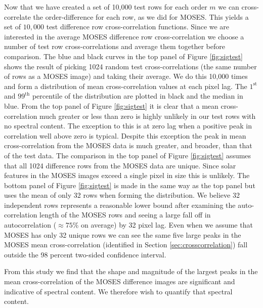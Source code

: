		Now that we have created a set of 10,000 test rows for each order $m$ we can cross-correlate the order-difference for each row, as we did for MOSES. 
		This yields a set of $10,000$ test difference row cross-correlation functions.
		Since we are interested in the average MOSES difference row cross-correlation we choose a number of test row cross-correlations and average them together before comparison.
		The blue and black curves in the top panel of Figure \ref{fig:sigtest} shows the result of picking 1024 random test cross-correlations (the same number of rows as a MOSES image) and taking their average.
		We do this 10,000 times and form a distribution of mean cross-correlation values at each pixel lag.
		The $1^\text{st}$ and $99^\text{th}$ percentile of the distribution are plotted in black and the median in blue.
		From the top panel of Figure \ref{fig:sigtest} it is clear that a mean cross-correlation much greater or less than zero is highly unlikely in our test rows with no spectral content.
		The exception to this is at zero lag when a positive peak in correlation well above zero is typical.
		Despite this exception the peak in mean cross-correlation from the MOSES data is much greater, and broader, than that of the test data.
		The comparison in the top panel of Figure \ref{fig:sigtest} assumes that all 1024 difference rows from the MOSES data are unique.
		Since solar features in the MOSES images exceed a single pixel in size this is unlikely.
		The bottom panel of Figure \ref{fig:sigtest} is made in the same way as the top panel but uses the mean of only 32 rows when forming the distribution.
		We believe 32 independent rows represents a reasonable lower bound after examining the auto-correlation length of the MOSES rows and seeing a large fall off in autocorrelation ($\approx75$\% on average) by 32 pixel lag.
		Even when we assume that MOSES has only 32 unique rows we can see the same five large peaks in the MOSES mean cross-correlation (identified in Section \ref{sec:crosscorrelation}) fall outside the 98 percent two-sided confidence interval.
		
		
		From this study we find that the shape and magnitude of the largest peaks in the mean cross-correlation of the MOSES difference images are significant and indicative of spectral content.
		We therefore wish to quantify that spectral content.
		
